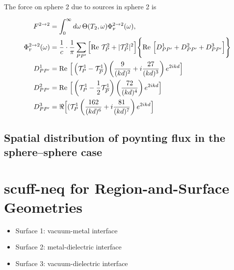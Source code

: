 \documentclass[letterpaper]{article}
\begin{document}
The force on sphere 2 due to sources in sphere 2 is

\begin{align*}
 F^{2\to 2}
&=
 \int_0^\infty d\omega \, \Theta(T_2,\omega) \Phi_{\hbox{\tiny{F}}}^{2\to 2}(\omega),
\\
 \Phi_{\hbox{\tiny{F}}}^{2\to 2}(\omega)
&= \frac{1}{c}
   \cdot
   \frac{1}{\pi}\sum_{P P^\prime}
   \Big[ \text{Re }\mathcal{T}^2_P + |\mathcal{T}^2_P|^2\Big]
   \Bigg\{
   \text{Re }
     \Big[ D^1_{PP^\prime} + D^2_{PP^\prime} + D^3_{PP^\prime} \Big]
   \Bigg\}
\\
 D^1_{PP^\prime}
 &=\text{Re }
   \Big[ \left(\mathcal{T}^1_P - \mathcal{T}^1_{\overline{P}}\right)
         \left(\frac{9}{(kd)^2} + i\frac{27}{(kd)^3}\right)
         e^{2ikd}
   \Big]
\\
 D^2_{PP^\prime}
 &=\text{Re }
   \Big[ \left(\mathcal{T}^1_P - \frac{1}{2}\mathcal{T}^1_{\overline{P}}\right)
         \left(\frac{72}{(kd)^4}\right)
         e^{2ikd}
   \Big]
\\
 D^3_{PP^\prime}
 &=\Re
   \Big[ (\mathcal{T}^1_P
         \left(\frac{162}{(kd)^6} + i\frac{81}{(kd)^7} \right)
         e^{2ikd}
   \Big]
\end{align*}

\subsection{Spatial distribution of poynting flux in the sphere--sphere case}

\newpage
\section{{\sc scuff-neq} for Region-and-Surface Geometries}

\begin{itemize}
 \item Surface 1: vacuum-metal interface
 \item Surface 2: metal-dielectric interface
 \item Surface 3: vacuum-dielectric interface
\end{itemize}
\end{document}
